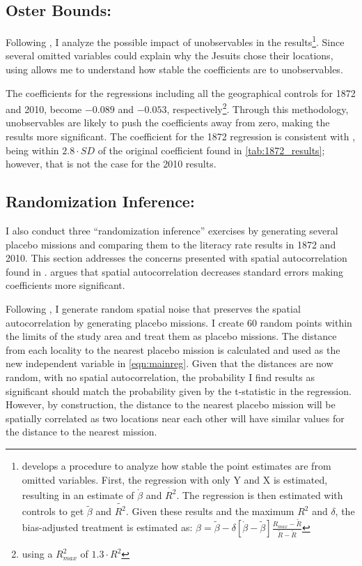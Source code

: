 \documentclass{article}
\begin{document}
\subsection{Oster Bounds:}

Following \textcite{Oster2019-qd}, I analyze the possible impact of unobservables in the results\footnote{
  \textcite{Oster2019-qd} develops a procedure to analyze how stable the point estimates are from omitted variables. 
  First, the regression with only Y and X is estimated, resulting in an estimate of $\mathring{\beta}$ and $\mathring{R^2}$. 
  The regression is then estimated with controls to get $\tilde{\beta}$ and $\tilde{R^2}$. Given these results and the maximum $R^2$ and $\delta$, the bias-adjusted treatment is estimated as: $ \beta = \tilde{\beta} - \delta[\mathring{\beta} - \tilde{\beta}] \frac{R_{max} - \tilde{R}}{\tilde{R} - \mathring{R}}$}.
Since several omitted variables could explain why the Jesuits chose their locations, using \cite{Oster2019-qd} allows me to understand how stable the coefficients are to unobservables.

The coefficients for the regressions including all the geographical controls for 1872 and 2010, become $-0.089$ and $-0.053$, respectively\footnote{using a $R^2_{max}$ of $1.3 \cdot R^2$}. 
Through this methodology, unobservables are likely to push the coefficients away from zero, making the results more significant. 
The coefficient for the 1872 regression is consistent with \textcite{Oster2019-qd}, being within $2.8 \cdot SD$ of the original coefficient found in \autoref{tab:1872_results}; however, that is not the case for the 2010 results.

\subsection{Randomization Inference:}

I also conduct three “randomization inference” exercises by generating several placebo missions and comparing them to the literacy rate results in 1872 and 2010. 
This section addresses the concerns presented with spatial autocorrelation found in \textcite{Kelly2019-ln}. 
\textcite{Kelly2019-ln} argues that spatial autocorrelation decreases standard errors making coefficients more significant.


Following \textcite{Kelly2019-ln}, I generate random spatial noise that preserves the spatial autocorrelation by generating placebo missions. 
I create 60 random points within the limits of the study area and treat them as placebo missions. 
The distance from each locality to the nearest placebo mission is calculated and used as the new independent variable in \autoref{eqn:mainreg}. 
Given that the distances are now random, with no spatial autocorrelation, the probability I find results as significant should match the probability given by the t-statistic in the regression. 
However, by construction, the distance to the nearest placebo mission will be spatially correlated as two locations near each other will have similar values for the distance to the nearest mission.
\end{document}
